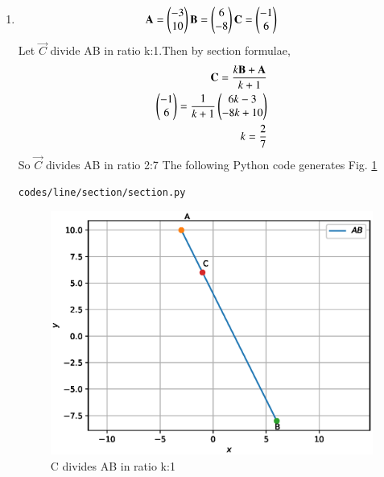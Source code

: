 \renewcommand{\theequation}{\theenumi}
\begin{enumerate}[label=\thesection.\arabic*.,ref=\thesection.\theenumi]

\item 
\begin{align}
\mathbf{A}=\begin{pmatrix}-3\\10\end{pmatrix}
\mathbf{B}=\begin{pmatrix}6\\-8\end{pmatrix}
\mathbf{C}=\begin{pmatrix}-1\\6\end{pmatrix}
\end{align}
Let $\vec{C}$ divide AB in ratio k:1.Then by section formulae,
\begin{align}
\mathbf{C}=\frac{k\mathbf{B}+\mathbf{A}}{k+1}
\\
\begin{pmatrix}-1\\6\end{pmatrix}=\frac{1}{k+1}\begin{pmatrix}6k-3\\-8k+10\end{pmatrix}
\\
k=\frac{2}{7}
\end{align}
So $\vec{C}$ divides AB in ratio 2:7
\newline
The following Python code generates Fig. \ref{fig:section}
%
\begin{lstlisting}
codes/line/section/section.py
\end{lstlisting}
\begin{figure}[!ht]
\centering
\includegraphics[width=\columnwidth]{./codes/line/section/pyfigs/section.eps}
\caption{C divides AB in ratio k:1}
\label{fig:section}
\end{figure}
\end{enumerate}
